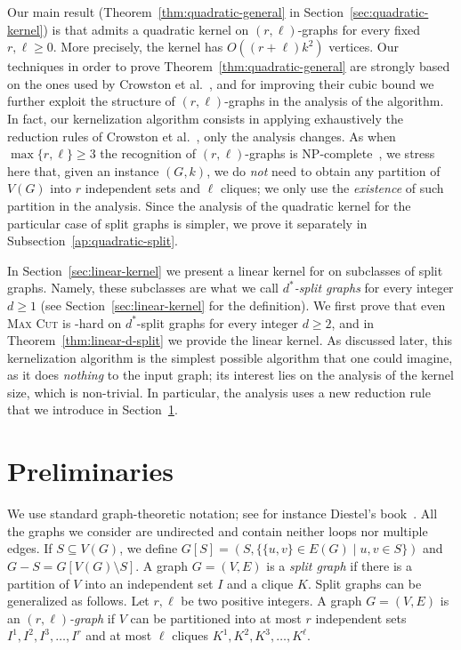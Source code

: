 \documentclass[
final
]{dmtcs-episciences}
\begin{document}
Our main result (Theorem~\ref{thm:quadratic-general} in Section~\ref{sec:quadratic-kernel}) is that {} admits a quadratic kernel on $(r,\ell)$-graphs for every fixed $r,\ell \geq 0$. More precisely, the kernel has $O((r + \ell)k^2)$ vertices. Our techniques in order to prove Theorem~\ref{thm:quadratic-general} are strongly based on the ones used by Crowston et al.~\cite{crowston2013maximum}, and for improving their cubic bound we further exploit the structure of $(r,\ell)$-graphs in the analysis of the algorithm. In fact, our kernelization algorithm consists in applying exhaustively the reduction rules of Crowston et al.~\cite{crowston2013maximum}, only the analysis changes. As when  $\max\{r,\ell\} \geq 3$ the recognition of $(r,\ell)$-graphs is {\sf NP}-complete~\cite{Bra96,FHKM03}, we stress here that, given an instance $(G,k)$, we do {\sl not} need to obtain any partition of $V(G)$ into $r$ independent sets and $\ell$ cliques; we only use the {\sl existence} of such partition in the analysis. Since the analysis of the quadratic kernel for the particular case of split graphs is simpler, we prove it separately in Subsection~\ref{ap:quadratic-split}.

In Section~\ref{sec:linear-kernel} we present a linear kernel for {} on subclasses of split graphs. Namely, these subclasses are what we call \emph{$d^*$-split graphs} for every integer $d \geq 1$ (see Section~\ref{sec:linear-kernel} for the definition). We first prove  that even \textsc{Max Cut} is {}-hard on $d^*$-split graphs for every integer $d \geq 2$, and in Theorem~\ref{thm:linear-d-split} we provide the linear kernel. As discussed later, this kernelization algorithm is the simplest possible algorithm that one could imagine, as it does {\sl nothing} to the input graph; its interest lies on the analysis of the kernel size, which is non-trivial. In particular, the analysis uses a new reduction rule that we introduce in Section~\ref{s2}.




\section{Preliminaries}
\label{s2}
	
We use standard graph-theoretic notation; see for instance Diestel's book~\cite{Diestel05}. All the graphs we consider are undirected and contain neither loops nor multiple edges. If $S \subseteq V(G)$, we define $G[S]=(S, \{\{u,v\} \in E(G)\mid u,v \in S\})$ and $G-S = G[V(G) \setminus S]$. A graph $G=(V,E)$ is a {\it{split graph}} if there is a partition of $V$ into an independent set $I$ and a clique $K$. Split graphs can be generalized as follows. Let $r,\ell$ be two positive integers. A graph $G=(V,E)$ is an {\it{$(r,\ell)$-graph}} if $V$ can be partitioned into at most $r$ independent sets $I^1, I^2, I^3, \ldots, I^r$  and at most $\ell$ cliques $K^1, K^2, K^3, \ldots, K^{\ell}$.
\end{document}
